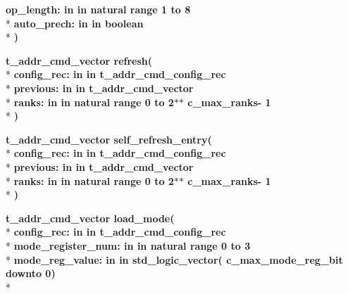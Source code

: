 \begin{DoxyCompactItemize}
{\bfseries \textcolor{vhdlchar}{op\+\_\+length\+: }\textcolor{stringliteral}{in }\textcolor{vhdlchar}{in natural   range  1 to  8}}\\*
{\bfseries \textcolor{vhdlchar}{auto\+\_\+prech\+: }\textcolor{stringliteral}{in }\textcolor{vhdlchar}{in boolean}}\\*
{\bfseries  )} 
\item 
{\bfseries {\bfseries {\bfseries {\bf t\+\_\+addr\+\_\+cmd\+\_\+vector}} \textcolor{vhdlchar}{ }}} {\bf refresh}{\bfseries  ( }\\*
{\bfseries \textcolor{vhdlchar}{config\+\_\+rec\+: }\textcolor{stringliteral}{in }\textcolor{vhdlchar}{in t\+\_\+addr\+\_\+cmd\+\_\+config\+\_\+rec}}\\*
{\bfseries \textcolor{vhdlchar}{previous\+: }\textcolor{stringliteral}{in }\textcolor{vhdlchar}{in t\+\_\+addr\+\_\+cmd\+\_\+vector}}\\*
{\bfseries \textcolor{vhdlchar}{ranks\+: }\textcolor{stringliteral}{in }\textcolor{vhdlchar}{in natural   range  0 to  2$\ast$$\ast$   c\+\_\+max\+\_\+ranks-\/ 1}}\\*
{\bfseries  )} 
\item 
{\bfseries {\bfseries {\bfseries {\bf t\+\_\+addr\+\_\+cmd\+\_\+vector}} \textcolor{vhdlchar}{ }}} {\bf self\+\_\+refresh\+\_\+entry}{\bfseries  ( }\\*
{\bfseries \textcolor{vhdlchar}{config\+\_\+rec\+: }\textcolor{stringliteral}{in }\textcolor{vhdlchar}{in t\+\_\+addr\+\_\+cmd\+\_\+config\+\_\+rec}}\\*
{\bfseries \textcolor{vhdlchar}{previous\+: }\textcolor{stringliteral}{in }\textcolor{vhdlchar}{in t\+\_\+addr\+\_\+cmd\+\_\+vector}}\\*
{\bfseries \textcolor{vhdlchar}{ranks\+: }\textcolor{stringliteral}{in }\textcolor{vhdlchar}{in natural   range  0 to  2$\ast$$\ast$   c\+\_\+max\+\_\+ranks-\/ 1}}\\*
{\bfseries  )} 
\item 
{\bfseries {\bfseries {\bfseries {\bf t\+\_\+addr\+\_\+cmd\+\_\+vector}} \textcolor{vhdlchar}{ }}} {\bf load\+\_\+mode}{\bfseries  ( }\\*
{\bfseries \textcolor{vhdlchar}{config\+\_\+rec\+: }\textcolor{stringliteral}{in }\textcolor{vhdlchar}{in t\+\_\+addr\+\_\+cmd\+\_\+config\+\_\+rec}}\\*
{\bfseries \textcolor{vhdlchar}{mode\+\_\+register\+\_\+num\+: }\textcolor{stringliteral}{in }\textcolor{vhdlchar}{in natural   range  0 to  3}}\\*
{\bfseries \textcolor{vhdlchar}{mode\+\_\+reg\+\_\+value\+: }\textcolor{stringliteral}{in }\textcolor{vhdlchar}{in std\+\_\+logic\+\_\+vector(   c\+\_\+max\+\_\+mode\+\_\+reg\+\_\+bit downto  0)}}\\*

\end{DoxyCompactItemize}
